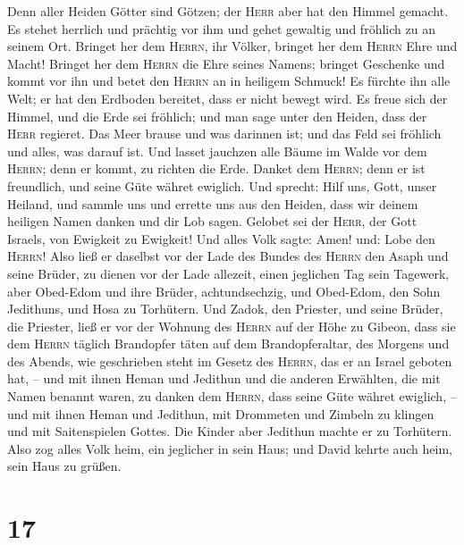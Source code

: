 Denn aller Heiden Götter sind Götzen; der \textsc{Herr} aber hat den
Himmel gemacht.  Es stehet herrlich und prächtig vor ihm
und gehet gewaltig und fröhlich zu an seinem Ort. 
Bringet her dem \textsc{Herrn}, ihr Völker, bringet her dem
\textsc{Herrn} Ehre und Macht!  Bringet her dem
\textsc{Herrn} die Ehre seines Namens; bringet Geschenke und kommt vor
ihn und betet den \textsc{Herrn} an in heiligem Schmuck! 
Es fürchte ihn alle Welt; er hat den Erdboden bereitet, dass er nicht
bewegt wird.  Es freue sich der Himmel, und die Erde sei
fröhlich; und man sage unter den Heiden, dass der \textsc{Herr}
regieret.  Das Meer brause und was darinnen ist; und das
Feld sei fröhlich und alles, was darauf ist.  Und lasset
jauchzen alle Bäume im Walde vor dem \textsc{Herrn}; denn er kommt, zu
richten die Erde.  Danket dem \textsc{Herrn}; denn er ist
freundlich, und seine Güte währet ewiglich.  Und sprecht:
Hilf uns, Gott, unser Heiland, und sammle uns und errette uns aus den
Heiden, dass wir deinem heiligen Namen danken und dir Lob sagen.
 Gelobet sei der \textsc{Herr}, der Gott Israels, von
Ewigkeit zu Ewigkeit! Und alles Volk sagte: Amen! und: Lobe den
\textsc{Herrn}!  Also ließ er daselbst vor der Lade des
Bundes des \textsc{Herrn} den Asaph und seine Brüder, zu dienen vor der
Lade allezeit, einen jeglichen Tag sein Tagewerk,  aber
Obed-Edom und ihre Brüder, achtundsechzig, und Obed-Edom, den Sohn
Jedithuns, und Hosa zu Torhütern.  Und Zadok, den
Priester, und seine Brüder, die Priester, ließ er vor der Wohnung des
\textsc{Herrn} auf der Höhe zu Gibeon,  dass sie dem
\textsc{Herrn} täglich Brandopfer täten auf dem Brandopferaltar, des
Morgens und des Abends, wie geschrieben steht im Gesetz des
\textsc{Herrn}, das er an Israel geboten hat, --  und mit
ihnen Heman und Jedithun und die anderen Erwählten, die mit Namen
benannt waren, zu danken dem \textsc{Herrn}, dass seine Güte währet
ewiglich, --  und mit ihnen Heman und Jedithun, mit
Drommeten und Zimbeln zu klingen und mit Saitenspielen Gottes. Die
Kinder aber Jedithun machte er zu Torhütern.  Also zog
alles Volk heim, ein jeglicher in sein Haus; und David kehrte auch heim,
sein Haus zu grüßen.

\hypertarget{section-16}{%
\section{17}\label{section-16}}

